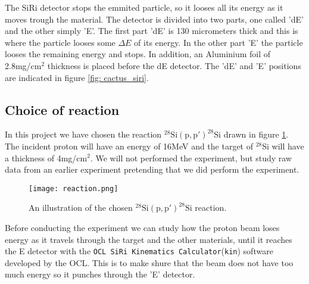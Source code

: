 \documentclass[11pt,a4wide]{article}
\begin{document}
The SiRi detector stops the emmited particle, so it looses all its energy as it moves trough the material. The detector is divided into two parts, one called 'dE' and the other simply 'E'. The first part 'dE' is 130 micrometers thick and this is where the particle looses some $\Delta E$ of its energy. In the other part 'E' the particle looses the remaining energy and stops. In addition, an Aluminium foil of 2.8mg/cm${}^2$ thickness is placed before the dE detector. The 'dE' and 'E' positions are indicated in figure \ref{fig: cactus_siri}.



\subsection{Choice of reaction}%
In this project we have chosen the reaction ${}^{28}\mathrm{Si(p,p')}^{28}\mathrm{Si}$ drawn in figure \ref{fig: reaction}. The incident proton will have an energy of 16MeV and the target of ${}^28$Si will have a thickness of 4mg/cm${}^2$. We will not performed the experiment, but study raw data from an earlier experiment pretending that we did perform the experiment. 

\begin{figure}[htp]
\centering
\texttt{[image: reaction.png]}
\caption{An illustration of the chosen ${}^{28}\mathrm{Si(p,p')}^{28}\mathrm{Si}$ reaction.}
\label{fig: reaction}
\end{figure}

Before conducting the experiment we can study how the proton beam loses energy as it travels through the target and the other materials, until it reaches the E detector with the \texttt{OCL SiRi Kinematics Calculator}(\texttt{kin}) software developed by the OCL. This is to make shure that the beam does not have too much energy so it punches through the 'E' detector. 
\end{document}
